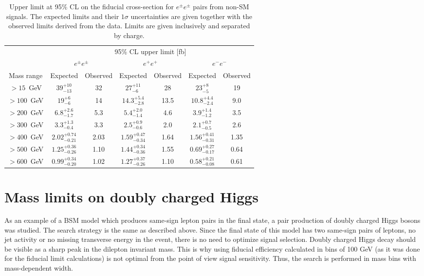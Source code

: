 \begin{table*}[!ht]
\begin{center}
\begin{tabular}{c||c|c||c|c||c|c}

 & \multicolumn{6}{c}{95\%  CL upper limit [fb]} \\
 & \multicolumn{2}{c||}{$e^{\pm}e^{\pm}$} & \multicolumn{2}{c||}{$e^{+}e^{+}$} & \multicolumn{2}{c}{$e^{-}e^{-}$} \\
Mass range & Expected & Observed & Expected & Observed & Expected & Observed \\
\hline
\rule{0pt}{3ex}
  $>15$~GeV   &  $39^{+10}_{-13}$        &  32    &    $27^{+11}_{-6}$         &  28    &    $23^{+8}_{-5}$          &  19\\
  $>100$~GeV  &  $19^{+6}_{-6}$          &  14    &    $14.3^{+5.4}_{-2.8}$    &  13.5  &    $10.8^{+4.4}_{-2.4}$    &  9.0\\
  $>200$~GeV  &  $6.8^{+2.6}_{-1.7}$     &  5.3   &    $5.4^{+2.0}_{-1.4}$     &  4.6   &    $3.9^{+1.4}_{-1.2}$     &  3.5\\
  $>300$~GeV  &  $3.3^{+1.3}_{-0.4}$     &  3.3   &    $2.5^{+0.9}_{-0.6}$     &  2.0   &    $2.1^{+0.7}_{-0.5}$     &  2.6\\
  $>400$~GeV  &  $2.02^{+0.74}_{-0.21}$  &  2.03  &    $1.59^{+0.47}_{-0.34}$  &  1.64  &    $1.56^{+0.41}_{-0.31}$  &  1.35\\
  $>500$~GeV  &  $1.25^{+0.36}_{-0.26}$  &  1.10  &    $1.44^{+0.34}_{-0.36}$  &  1.55  &    $0.69^{+0.27}_{-0.17}$  &  0.64\\
  $>600$~GeV  &  $0.99^{+0.34}_{-0.20}$  &  1.02  &    $1.27^{+0.37}_{-0.26}$  &  1.10  &    $0.58^{+0.21}_{-0.08}$  &  0.61\\

\end{tabular}
\end{center}
 \caption{Upper limit at 95\% CL on the fiducial cross-section for $e^{\pm} e^{\pm}$ pairs from non-SM signals. 
 The expected limits and their $1 \sigma$ uncertainties are given together with the observed limits derived from the data. 
 Limits are given inclusively and separated by charge.}
\label{tab:limits}
\end{table*}


\section{Mass limits on doubly charged Higgs}
As an example of a BSM model which produces same-sign lepton pairs in the final state, a pair production of doubly charged Higgs bosons was studied.
The search strategy is the same as described above.
Since the final state of this model has two same-sign pairs of leptons, no jet activity or no missing transverse energy in the event, 
there is no need to optimize signal selection.
Doubly charged Higgs decay should be visible as a sharp peak in the dilepton invariant mass.
This is why using fiducial efficiency calculated in bins of 100 GeV (as it was done for the fiducial limit calculations) is not optimal from the point of view signal sensitivity.
Thus, the search is performed in mass bins with mass-dependent width.

